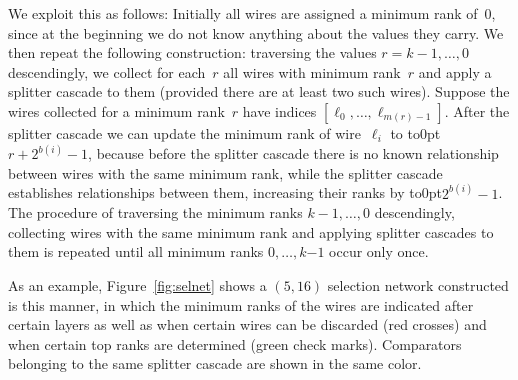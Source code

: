 \documentclass{article}
\begin{document}
We exploit this as follows: Initially all wires are assigned a minimum
rank of~0, since at the beginning we do not know anything about the
values they carry. We then repeat the following construction:
traversing the values $r = k{-}1,\ldots,0$ descendingly, we collect
for each~$r$ all wires with minimum rank~$r$ and apply a splitter
cascade to them (provided there are at least two such wires).
Suppose the wires collected for a minimum rank~$r$ have indices
$[\ell_0,\ldots,\ell_{m(r)-1}]$. After the splitter cascade
we can update the minimum rank of wire~$\ell_i$ to
\hbox{\vbox to0pt{\vss\hbox{$r +2^{b(i)}{-}1$}}}, because
before the splitter cascade there is no known relationship between
wires with the same minimum rank, while the splitter cascade
establishes relationships between them, increasing their ranks by
\hbox{\vbox to0pt{\vss\hbox{$2^{b(i)}{-}1$}}}. The procedure of
traversing the minimum ranks $k{-}1,\ldots,0$ descendingly,
collecting wires with the same minimum rank and applying splitter
cascades to them is repeated until all minimum ranks $0,\ldots,k{-1}$
occur only once.

As an example, Figure~\ref{fig:selnet} shows a $(5,16)$ selection
network constructed is this manner, in which the minimum ranks of the
wires are indicated after certain layers as well as when certain wires
can be discarded (red crosses) and when certain top ranks are determined
(green check marks). Comparators belonging to the same splitter cascade
are shown in the same color.
\end{document}
